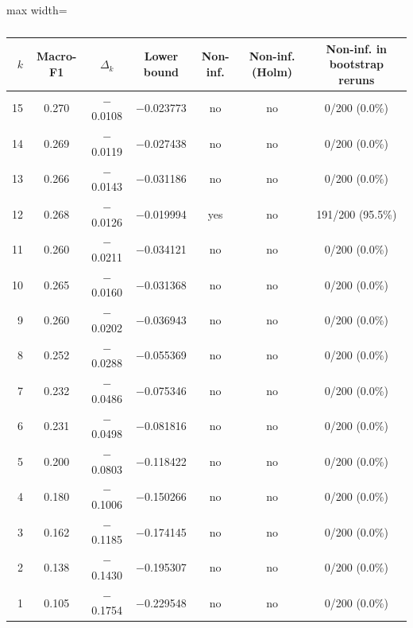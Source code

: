 \begin{table}[htbp]
\centering
\small
\caption{}
\label{tab:replication}
\setlength{\tabcolsep}{4pt}
\begin{adjustbox}{max width=\textwidth}
\begin{tabular}{rcccccc}
\toprule
$k$ & Macro-F1 & $\Delta_k$ & Lower bound & Non-inf. & Non-inf. (Holm) & Non-inf. in bootstrap reruns \\
\midrule
15 & 0.270 & $-$0.0108 & $-$0.023773 & no & no & 0/200 (0.0\%) \\
14 & 0.269 & $-$0.0119 & $-$0.027438 & no & no & 0/200 (0.0\%) \\
13 & 0.266 & $-$0.0143 & $-$0.031186 & no & no & 0/200 (0.0\%) \\
12 & 0.268 & $-$0.0126 & $-$0.019994 & yes & no & 191/200 (95.5\%) \\
11 & 0.260 & $-$0.0211 & $-$0.034121 & no & no & 0/200 (0.0\%) \\
10 & 0.265 & $-$0.0160 & $-$0.031368 & no & no & 0/200 (0.0\%) \\
9 & 0.260 & $-$0.0202 & $-$0.036943 & no & no & 0/200 (0.0\%) \\
8 & 0.252 & $-$0.0288 & $-$0.055369 & no & no & 0/200 (0.0\%) \\
7 & 0.232 & $-$0.0486 & $-$0.075346 & no & no & 0/200 (0.0\%) \\
6 & 0.231 & $-$0.0498 & $-$0.081816 & no & no & 0/200 (0.0\%) \\
5 & 0.200 & $-$0.0803 & $-$0.118422 & no & no & 0/200 (0.0\%) \\
4 & 0.180 & $-$0.1006 & $-$0.150266 & no & no & 0/200 (0.0\%) \\
3 & 0.162 & $-$0.1185 & $-$0.174145 & no & no & 0/200 (0.0\%) \\
2 & 0.138 & $-$0.1430 & $-$0.195307 & no & no & 0/200 (0.0\%) \\
1 & 0.105 & $-$0.1754 & $-$0.229548 & no & no & 0/200 (0.0\%) \\
\bottomrule
\end{tabular}
\end{adjustbox}
\end{table}
